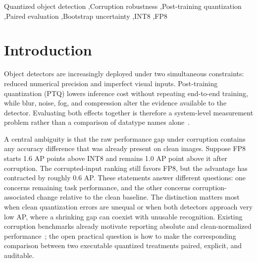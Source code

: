 \documentclass[a4paper,fleqn]{cas-dc}
\begin{document}
\begin{titlepage}
\begin{keywords}
Quantized object detection \sep Corruption robustness \sep Post-training quantization \sep Paired evaluation \sep Bootstrap uncertainty \sep INT8 \sep FP8
\end{keywords}

\maketitle
{}
\end{titlepage}


\section{Introduction}
\label{sec:introduction}

Object detectors are increasingly deployed under two simultaneous constraints: reduced numerical precision and imperfect visual inputs. Post-training quantization (PTQ) lowers inference cost without repeating end-to-end training, while blur, noise, fog, and compression alter the evidence available to the detector. Evaluating both effects together is therefore a system-level measurement problem rather than a comparison of datatype names alone~\citep{thacker2008performance,wen2020uadetrac}.

A central ambiguity is that the raw performance gap under corruption contains any accuracy difference that was already present on clean images. Suppose FP8 starts 1.6 AP points above INT8 and remains 1.0 AP point above it after corruption. The corrupted-input ranking still favors FP8, but the advantage has contracted by roughly 0.6 AP. These statements answer different questions: one concerns remaining task performance, and the other concerns corruption-associated change relative to the clean baseline. The distinction matters most when clean quantization errors are unequal or when both detectors approach very low AP, where a shrinking gap can coexist with unusable recognition. Existing corruption benchmarks already motivate reporting absolute and clean-normalized performance~\citep{michaelis2019detectorrobustness}; the open practical question is how to make the corresponding comparison between two executable quantized treatments paired, explicit, and auditable.
\end{document}
